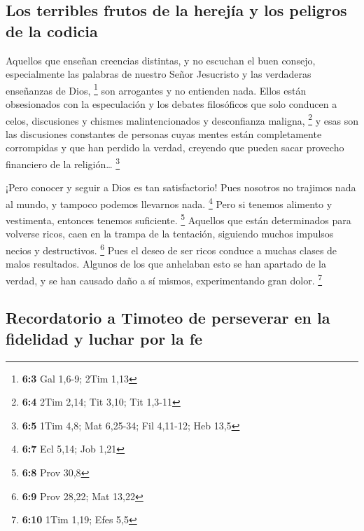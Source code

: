 \hypertarget{los-terribles-frutos-de-la-herejuxeda-y-los-peligros-de-la-codicia}{%
\subsection{Los terribles frutos de la herejía y los peligros de la
codicia}\label{los-terribles-frutos-de-la-herejuxeda-y-los-peligros-de-la-codicia}}

 Aquellos que enseñan creencias distintas, y no escuchan
el buen consejo, especialmente las palabras de nuestro Señor Jesucristo
y las verdaderas enseñanzas de Dios, \footnote{\textbf{6:3} Gal 1,6-9;
  2Tim 1,13}  son arrogantes y no entienden nada. Ellos
están obsesionados con la especulación y los debates filosóficos que
solo conducen a celos, discusiones y chismes malintencionados y
desconfianza maligna, \footnote{\textbf{6:4} 2Tim 2,14; Tit 3,10; Tit
  1,3-11}  y esas son las discusiones constantes de
personas cuyas mentes están completamente corrompidas y que han perdido
la verdad, creyendo que pueden sacar provecho financiero de la
religión\ldots{} \footnote{\textbf{6:5} 1Tim 4,8; Mat 6,25-34; Fil
  4,11-12; Heb 13,5}

 ¡Pero conocer y seguir a Dios es tan satisfactorio!
 Pues nosotros no trajimos nada al mundo, y tampoco
podemos llevarnos nada. \footnote{\textbf{6:7} Ecl 5,14; Job 1,21}
 Pero si tenemos alimento y vestimenta, entonces tenemos
suficiente. \footnote{\textbf{6:8} Prov 30,8}  Aquellos
que están determinados para volverse ricos, caen en la trampa de la
tentación, siguiendo muchos impulsos necios y destructivos. \footnote{\textbf{6:9}
  Prov 28,22; Mat 13,22}  Pues el deseo de ser ricos
conduce a muchas clases de malos resultados. Algunos de los que
anhelaban esto se han apartado de la verdad, y se han causado daño a sí
mismos, experimentando gran dolor. \footnote{\textbf{6:10} 1Tim 1,19;
  Efes 5,5}

\hypertarget{recordatorio-a-timoteo-de-perseverar-en-la-fidelidad-y-luchar-por-la-fe}{%
\subsection{Recordatorio a Timoteo de perseverar en la fidelidad y
luchar por la
fe}\label{recordatorio-a-timoteo-de-perseverar-en-la-fidelidad-y-luchar-por-la-fe}}

